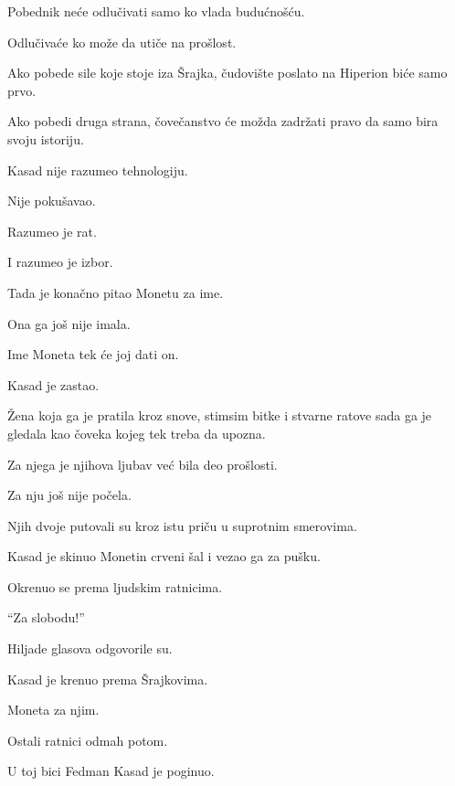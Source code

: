 \bigskip

Pobednik neće odlučivati samo ko vlada budućnošću.

Odlučivaće ko može da utiče na prošlost.

\bigskip

Ako pobede sile koje stoje iza Šrajka, čudovište poslato na Hiperion biće samo prvo.

Ako pobedi druga strana, čovečanstvo će možda zadržati pravo da samo bira svoju istoriju.

\bigskip

Kasad nije razumeo tehnologiju.

Nije pokušavao.

\bigskip

Razumeo je rat.

I razumeo je izbor.

\bigskip

Tada je konačno pitao Monetu za ime.

\bigskip

Ona ga još nije imala.

Ime Moneta tek će joj dati on.

\bigskip

Kasad je zastao.

Žena koja ga je pratila kroz snove, stimsim bitke i stvarne ratove sada ga je gledala kao čoveka kojeg tek treba da upozna.

\bigskip

Za njega je njihova ljubav već bila deo prošlosti.

Za nju još nije počela.

\bigskip

Njih dvoje putovali su kroz istu priču u suprotnim smerovima.

\bigskip

Kasad je skinuo Monetin crveni šal i vezao ga za pušku.

Okrenuo se prema ljudskim ratnicima.

\bigskip

``Za slobodu!''

\bigskip

Hiljade glasova odgovorile su.

\bigskip

Kasad je krenuo prema Šrajkovima.

Moneta za njim.

Ostali ratnici odmah potom.

\bigskip

U toj bici Fedman Kasad je poginuo.

